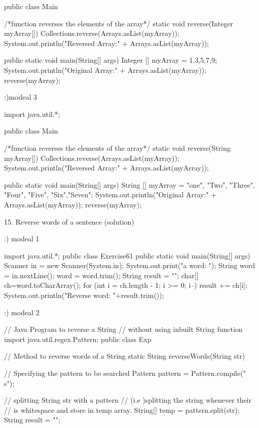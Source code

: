    public class Main { 
 
    /*function reverses the elements of the array*/
    static void reverse(Integer myArray[]) 
    { 
        Collections.reverse(Arrays.asList(myArray)); 
        System.out.println("Reversed Array:" + Arrays.asList(myArray)); 
    } 
 
     public static void main(String[] args) 
    { 
        Integer [] myArray = {1,3,5,7,9}; 
        System.out.println("Original Array:" + Arrays.asList(myArray));
        reverse(myArray); 
    } 

:)modeal 3 
     
	 
	 
	 import java.util.*;
 
public class Main {
 
    /*function reverses the elements of the array*/
    static void reverse(String myArray[])
    {
        Collections.reverse(Arrays.asList(myArray));
        System.out.println("Reversed Array:" + Arrays.asList(myArray));
    }
 
     public static void main(String[] args)
    {
        String [] myArray = {"one", "Two", "Three", "Four", "Five", "Six","Seven"};
        System.out.println("Original Array:" + Arrays.asList(myArray));
        reverse(myArray);
    }
}


15. Reverse words of a sentence (solution)

:) modeal 1

		import java.util.*;
		public class Exercise61 {
     public static void main(String[] args){	
     Scanner in = new Scanner(System.in);
     System.out.print("\nInput a word: ");
	 String word = in.nextLine();
	 word = word.trim();
	 String result = ""; 
     char[] ch=word.toCharArray();  
	 for (int i = ch.length - 1; i >= 0; i--) {
			 result += ch[i];
		 }
	 System.out.println("Reverse word: "+result.trim()); 
	 }			
}


:) modeal 2 

// Java Program to reverse a String
// without using inbuilt String function
import java.util.regex.Pattern;
public class Exp {
  
    // Method to reverse words of a String
    static String reverseWords(String str)
    {
  
        // Specifying the pattern to be searched
        Pattern pattern = Pattern.compile("\\s");
  
        // splitting String str with a pattern
        // (i.e )splitting the string whenever their
        //  is whitespace and store in temp array.
        String[] temp = pattern.split(str);
        String result = "";
  
}}}
